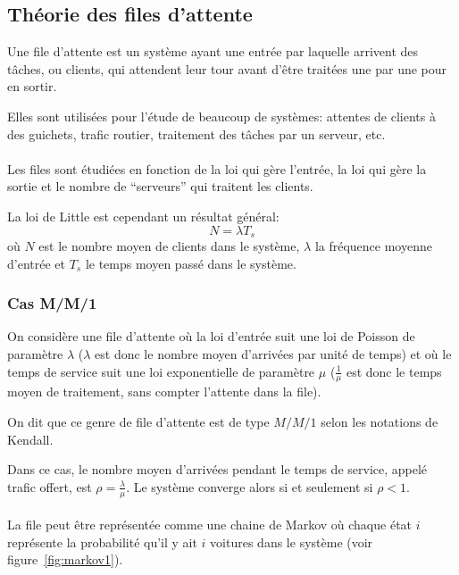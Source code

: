 \subsection{Théorie des files d'attente}
  Une file d'attente est un système ayant une entrée par laquelle arrivent des
  tâches, ou clients, qui attendent leur tour avant d'être traitées une par une pour en
  sortir.

  Elles sont utilisées pour l'étude de beaucoup de systèmes: attentes de
  clients à des guichets, trafic routier, traitement des tâches par un
  serveur, etc.

  \paragraph{}
  Les files sont étudiées en fonction de la loi qui gère l'entrée, la loi qui
  gère la sortie et le nombre de ``serveurs'' qui traitent les clients.

  La loi de Little est cependant un résultat général:
    \[N = \lambda T_s\]
  où $N$ est le nombre moyen de clients dans le système, $\lambda$ la fréquence
  moyenne d'entrée et $T_s$ le temps moyen passé dans le système.

  \subsubsection{Cas M/M/1}
    On considère une file d'attente où la loi d'entrée suit une loi de Poisson
    de paramètre $\lambda$ ($\lambda$ est donc le nombre moyen d'arrivées par
    unité de temps) et où le temps de service suit une loi exponentielle de
    paramètre $\mu$ ($\frac 1 \mu$ est donc le temps moyen de traitement, sans
    compter l'attente dans la file).

    On dit que ce genre de file d'attente est de type $M/M/1$ selon les
    notations de Kendall.

    Dans ce cas, le nombre moyen d'arrivées pendant le temps de service, appelé
    trafic offert, est $\rho = \frac \lambda \mu$. Le système converge alors si
    et seulement si $\rho < 1$.
    
    \paragraph{}
    La file peut être représentée comme une chaine de Markov où chaque état $i$
    représente la probabilité qu'il y ait $i$ voitures dans le système (voir
    figure~\ref{fig:markov1}).

